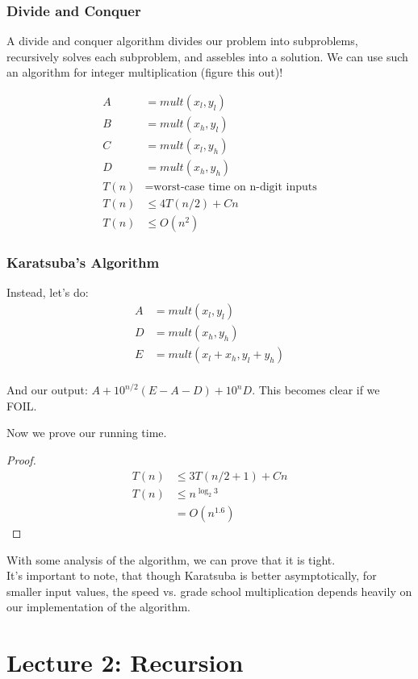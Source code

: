 \documentclass[11pt]{article}
\begin{document}
\subsubsection{Divide and Conquer}
A divide and conquer algorithm divides our problem into subproblems, recursively solves each subproblem, and assebles into a solution.
We can use such an algorithm for integer multiplication (figure this out)!

\begin{align*}
    A &= mult(x_l, y_l) \\
    B &= mult(x_h, y_l) \\
    C &= mult(x_l, y_h) \\
    D &= mult(x_h, y_h) \\
    T(n) &= \text{worst-case time on n-digit inputs} \\
    T(n) &\leq 4T(n/2)+Cn \\
    T(n) &\leq O(n^2) %
\end{align*}

\subsubsection{Karatsuba's Algorithm}
Instead, let's do:
\begin{align*}
    A &= mult(x_l, y_l) \\
    D &= mult(x_h, y_h) \\
    E &= mult(x_l + x_h, y_l + y_h) \\
\end{align*}

And our output: $A + 10^{n/2}(E-A-D) + 10^nD$. This becomes clear if we FOIL.

Now we prove our running time.
\begin{proof}
    \begin{align*}
    T(n) &\leq 3T(n/2 + 1) + Cn \\
    T(n) &\leq n^{\log_2{3}} \\
         &= O(n^{1.6})
    \end{align*}
\end{proof}
With some analysis of the algorithm, we can prove that it is tight. \\
It's important to note, that though Karatsuba is better asymptotically, for smaller input values, the speed vs. grade school multiplication depends heavily on our implementation of the algorithm.

\section{Lecture 2: Recursion}
\end{document}
